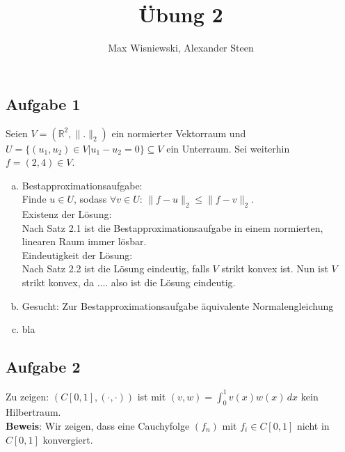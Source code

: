 \documentclass[11pt,a4paper,ngerman]{article}
\date{}
\title{Übung 2}
\author{Max Wisniewski, Alexander Steen}
\begin{document}

\renewcommand{\figurename}{Figure}

\maketitle
\thispagestyle{fancy}


\subsection*{Aufgabe 1}
Seien $V = (\mathbb{R}^2,\| . \|_2)$ ein normierter Vektorraum und
$U = \{(u_1,u_2) \in V| u_1 - u_2 = 0 \} \subseteq V$ ein Unterraum. Sei weiterhin $f = (2,4) \in V$.

\begin{enumerate}[a)]
\item Bestapproximationsaufgabe: \\
      Finde $u \in U$, sodass $\forall v \in U: \, \|f-u\|_2 \leq \|f-v\|_2$. \\
      Existenz der Lösung: \\
      Nach Satz 2.1 ist die Bestapproximationsaufgabe in einem normierten, linearen Raum immer lösbar. \\
      Eindeutigkeit der Lösung: \\
      Nach Satz 2.2 ist die Lösung eindeutig, falls $V$ strikt konvex ist. Nun ist $V$ strikt konvex, da
      ....
      also ist die Lösung eindeutig.
      
\item Gesucht: Zur Bestapproximationsaufgabe äquivalente Normalengleichung 
\item bla
\end{enumerate}
\subsection*{Aufgabe 2}
Zu zeigen: $(C[0,1],(\cdot,\cdot))$ ist mit $(v,w) = \int_0^1 v(x)w(x)\,dx$ kein Hilbertraum. \\
\textbf{Beweis}: Wir zeigen, dass eine Cauchyfolge $\left( f_n \right)$ mit $f_i \in C[0,1]$
                 nicht in $C[0,1]$ konvergiert. \\
\end{document}
